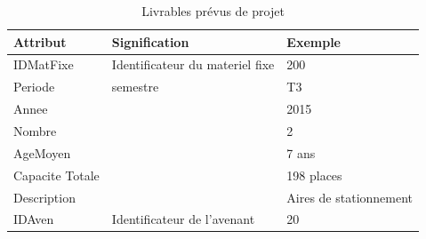 \documentclass[a4paper]{report}
\begin{document}
\begin{doublespace}
	\begin{table}[H]
		\begin{center}
			\begin{tabularx}{17.5cm}{|X|X|X|}
				\hline
				\textbf{Attribut} & \textbf{Signification}          &
				\textbf{Exemple}                                                             \\
				\hline
				IDMatFixe         & Identificateur du materiel fixe & 200                    \\
				\hline
				Periode           & semestre                        & T3                     \\
				\hline
				Annee             &                                 & 2015                   \\
				\hline
				Nombre            &                                 & 2                      \\
				\hline
				AgeMoyen          &                                 & 7 ans                  \\
				\hline
				Capacite Totale   &                                 & 198 places             \\
				\hline
				Description       &                                 & Aires de stationnement \\
				\hline
				IDAven            & Identificateur de l'avenant     & 20                     \\
				\hline
			\end{tabularx}
			\caption{Livrables prévus de projet}
		\end{center}
	\end{table}


\end{doublespace}
\end{document}
